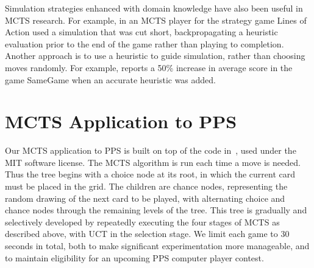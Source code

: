 \documentclass[letterpaper]{article}
\begin{document}
Simulation strategies enhanced with domain knowledge have also been useful in MCTS research. For example, in \cite{winands2010monte} an MCTS player for the strategy game Lines of Action used a simulation that was cut short, backpropagating a heuristic evaluation prior to the end of the game rather than playing to completion. Another approach is to use a heuristic to guide simulation, rather than choosing moves randomly. For example, \cite{schadd2012single} reports a 50\% increase in average score in the game SameGame when an accurate heuristic was added.

\section{MCTS Application to PPS}


Our MCTS application to PPS is built on top of the code in~\cite{hughart2012uct}, used under the MIT software license. The MCTS algorithm is run each time a move is needed. Thus the tree begins with a choice node at its root, in which the current card must be placed in the grid. The children are chance nodes, representing the random drawing of the next card to be played, with alternating choice and chance nodes through the remaining levels of the tree. This tree is gradually and selectively developed by repeatedly executing the four stages of MCTS as described above, with UCT in the selection stage. We limit each game to 30 seconds in total, both to make significant experimentation more manageable, and to maintain eligibility for an upcoming PPS computer player contest. 
\end{document}
